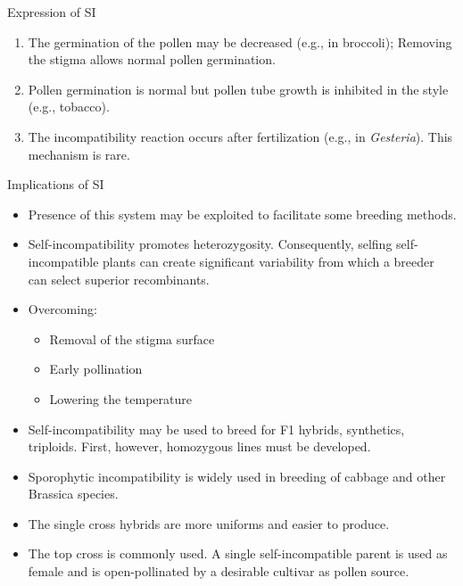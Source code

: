 \documentclass[11pt,ignorenonframetext,aspectratio=169]{beamer}
\providecommand{\tightlist}{%
  \setlength{\itemsep}{0pt}\setlength{\parskip}{0pt}}
\begin{document}
\begin{frame}{Expression of SI}
\protect\hypertarget{expression-of-si}{}
\begin{enumerate}
\tightlist
\item
  The germination of the pollen may be decreased (e.g., in broccoli);
  Removing the stigma allows normal pollen germination.
\item
  Pollen germination is normal but pollen tube growth is inhibited in
  the style (e.g., tobacco).
\item
  The incompatibility reaction occurs after fertilization (e.g., in
  \emph{Gesteria}). This mechanism is rare.
\end{enumerate}
\end{frame}

\begin{frame}{Implications of SI}
\protect\hypertarget{implications-of-si}{}
\begin{itemize}
\tightlist
\item
  Presence of this system may be exploited to facilitate some breeding
  methods.
\item
  Self-incompatibility promotes heterozygosity. Consequently, selfing
  self-incompatible plants can create significant variability from which
  a breeder can select superior recombinants.
\item
  Overcoming:

  \begin{itemize}
  \tightlist
  \item
    Removal of the stigma surface
  \item
    Early pollination
  \item
    Lowering the temperature
  \end{itemize}
\item
  Self-incompatibility may be used to breed for F1 hybrids, synthetics,
  triploids. First, however, homozygous lines must be developed.
\item
  Sporophytic incompatibility is widely used in breeding of cabbage and
  other Brassica species.
\item
  The single cross hybrids are more uniforms and easier to produce.
\item
  The top cross is commonly used. A single self-incompatible parent is
  used as female and is open-pollinated by a desirable cultivar as
  pollen source.
\end{itemize}
\end{frame}
\end{document}
